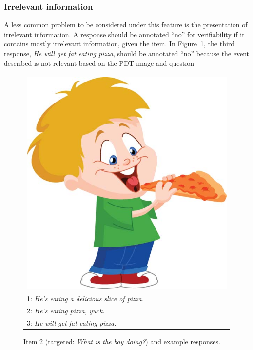 \documentclass[12pt,notitlepage]{article}
\newcommand{\lk}[1]{\marginpar{\linespread{1}\scriptsize LK: #1}}
\begin{document}
\subsubsection{Irrelevant information} 
A less common problem to be considered under this feature is the presentation of irrelevant information. A response should be annotated ``no'' for verifiability if it contains mostly irrelevant information, given the item. In Figure~\ref{fig:eat-pizza}, the third response, \textit{He will get fat eating pizza}, should be annotated ``no'' because the event described is not relevant based on the PDT image and question.

\begin{figure}[h]
\begin{center}
\begin{tabular}{|l|}
\hline
\includegraphics[width=0.4\columnwidth,trim=0 0 0 -3]{figures/I02.jpg}\\
\hline
1: \textit{He's eating a delicious slice of pizza.} \\
\hline
2: \textit{He's eating pizza, yuck.} \\
\hline
3: \textit{He will get fat eating pizza.} \\
\hline
\end{tabular}
\end{center}
\caption{Item 2 (targeted: \textit{What is the boy doing?}) and example responses.}
\label{fig:eat-pizza}
\end{figure}

\newpage
\end{document}
